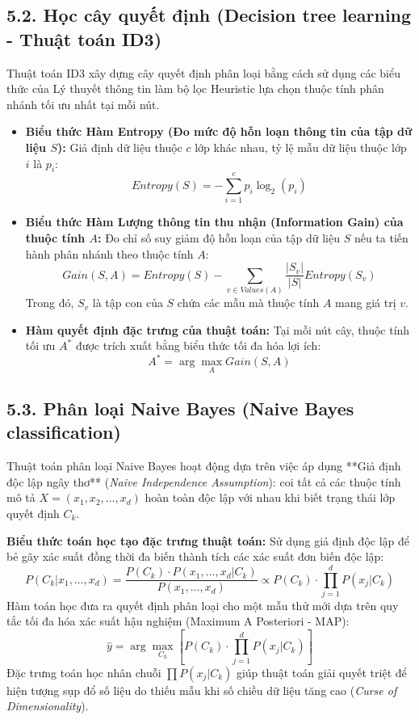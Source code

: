 \documentclass[11pt,a4paper]{article}
\begin{document}
\subsection{5.2. Học cây quyết định (Decision tree learning - Thuật toán ID3)}
Thuật toán ID3 xây dựng cây quyết định phân loại bằng cách sử dụng các biểu thức của Lý thuyết thông tin làm bộ lọc Heuristic lựa chọn thuộc tính phân nhánh tối ưu nhất tại mỗi nút.
\begin{itemize}
    \item \textbf{Biểu thức Hàm Entropy (Đo mức độ hỗn loạn thông tin của tập dữ liệu $S$):} Giả định dữ liệu thuộc $c$ lớp khác nhau, tỷ lệ mẫu dữ liệu thuộc lớp $i$ là $p_i$:
    \begin{equation}
        Entropy(S) = - \sum_{i=1}^{c} p_i \log_2(p_i)
    \end{equation}
    \item \textbf{Biểu thức Hàm Lượng thông tin thu nhận (Information Gain) của thuộc tính $A$:} Đo chỉ số suy giảm độ hỗn loạn của tập dữ liệu $S$ nếu ta tiến hành phân nhánh theo thuộc tính $A$:
    \begin{equation}
        Gain(S, A) = Entropy(S) - \sum_{v \in Values(A)} \frac{|S_v|}{|S|} Entropy(S_v)
    \end{equation}
    Trong đó, $S_v$ là tập con của $S$ chứa các mẫu mà thuộc tính $A$ mang giá trị $v$.
    \item \textbf{Hàm quyết định đặc trưng của thuật toán:} Tại mỗi nút cây, thuộc tính tối ưu $A^*$ được trích xuất bằng biểu thức tối đa hóa lợi ích:
    \begin{equation}
        A^* = \arg\max_{A} Gain(S, A)
    \end{equation}
\end{itemize}

\subsection{5.3. Phân loại Naive Bayes (Naive Bayes classification)}
Thuật toán phân loại Naive Bayes hoạt động dựa trên việc áp dụng **Giả định độc lập ngây thơ** (\textit{Naive Independence Assumption}): coi tất cả các thuộc tính mô tả $X = (x_1, x_2, ..., x_d)$ hoàn toàn độc lập với nhau khi biết trạng thái lớp quyết định $C_k$.

\textbf{Biểu thức toán học tạo đặc trưng thuật toán:} Sử dụng giả định độc lập để bẻ gãy xác suất đồng thời đa biến thành tích các xác suất đơn biến độc lập:
\begin{equation}
    P(C_k | x_1, ..., x_d) = \frac{P(C_k) \cdot P(x_1, ..., x_d | C_k)}{P(x_1, ..., x_d)} \propto P(C_k) \cdot \prod_{j=1}^{d} P(x_j | C_k)
\end{equation}
Hàm toán học đưa ra quyết định phân loại cho một mẫu thử mới dựa trên quy tắc tối đa hóa xác suất hậu nghiệm (Maximum A Posteriori - MAP):
\begin{equation}
    \hat{y} = \arg\max_{C_k} \left[ P(C_k) \cdot \prod_{j=1}^{d} P(x_j | C_k) \right]
\end{equation}
Đặc trưng toán học nhân chuỗi $\prod P(x_j | C_k)$ giúp thuật toán giải quyết triệt để hiện tượng sụp đổ số liệu do thiếu mẫu khi số chiều dữ liệu tăng cao (\textit{Curse of Dimensionality}).
\end{document}
